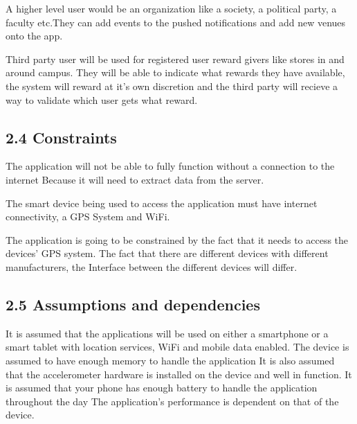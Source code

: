 \documentclass[11pt]{article}
\begin{document}
		A higher level user would be an organization like a society, a political party, a faculty etc.They can add events to the 		 pushed notifications and add new venues onto the app. 

		Third party user will be used for registered user reward givers like stores in and around campus. They will be able to 			indicate what rewards they have available, the system will reward at it’s own discretion and the third party will 			recieve a way to validate which user gets what reward.

		\subsection{2.4 Constraints}
		The application will not be able to fully function without a connection to the internet Because it will need to extract 		data from the server.

		The smart device being used to access the application must have internet connectivity, a GPS 
		System and WiFi.

		The application is going to be constrained by the fact that it needs to access the devices’ 
		GPS system. The fact that there are different devices with different manufacturers, the Interface between the different 		devices will differ.

		\subsection{2.5 Assumptions and dependencies}
		It is assumed that the applications will be used on either a smartphone or a smart tablet with location services, WiFi 			and mobile data enabled.
		The device is assumed to have enough memory to handle the application
		It is also assumed that the accelerometer hardware is installed on the device and well in function.
		It is assumed that your phone has enough battery to handle the application throughout the day
		The application’s performance is dependent on that of the device.


	
	
\end{document}
